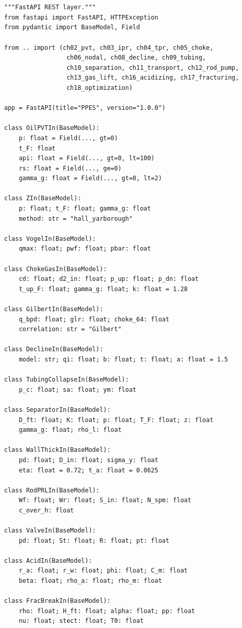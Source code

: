 \documentclass[10pt,a4paper,openany]{book}
\begin{document}
\chapter{}
\begin{lstlisting}
"""FastAPI REST layer."""
from fastapi import FastAPI, HTTPException
from pydantic import BaseModel, Field

from .. import (ch02_pvt, ch03_ipr, ch04_tpr, ch05_choke,
                 ch06_nodal, ch08_decline, ch09_tubing,
                 ch10_separation, ch11_transport, ch12_rod_pump,
                 ch13_gas_lift, ch16_acidizing, ch17_fracturing,
                 ch18_optimization)

app = FastAPI(title="PPES", version="1.0.0")

class OilPVTIn(BaseModel):
    p: float = Field(..., gt=0)
    t_F: float
    api: float = Field(..., gt=0, lt=100)
    rs: float = Field(..., ge=0)
    gamma_g: float = Field(..., gt=0, lt=2)

class ZIn(BaseModel):
    p: float; t_F: float; gamma_g: float
    method: str = "hall_yarborough"

class VogelIn(BaseModel):
    qmax: float; pwf: float; pbar: float

class ChokeGasIn(BaseModel):
    cd: float; d2_in: float; p_up: float; p_dn: float
    t_up_F: float; gamma_g: float; k: float = 1.28

class GilbertIn(BaseModel):
    q_bpd: float; glr: float; choke_64: float
    correlation: str = "Gilbert"

class DeclineIn(BaseModel):
    model: str; qi: float; b: float; t: float; a: float = 1.5

class TubingCollapseIn(BaseModel):
    p_c: float; sa: float; ym: float

class SeparatorIn(BaseModel):
    D_ft: float; K: float; p: float; T_F: float; z: float
    gamma_g: float; rho_l: float

class WallThickIn(BaseModel):
    pd: float; D_in: float; sigma_y: float
    eta: float = 0.72; t_a: float = 0.0625

class RodPRLIn(BaseModel):
    Wf: float; Wr: float; S_in: float; N_spm: float
    c_over_h: float

class ValveIn(BaseModel):
    pd: float; St: float; R: float; pt: float

class AcidIn(BaseModel):
    r_a: float; r_w: float; phi: float; C_m: float
    beta: float; rho_a: float; rho_m: float

class FracBreakIn(BaseModel):
    rho: float; H_ft: float; alpha: float; pp: float
    nu: float; stect: float; T0: float


\end{lstlisting}
\end{document}

